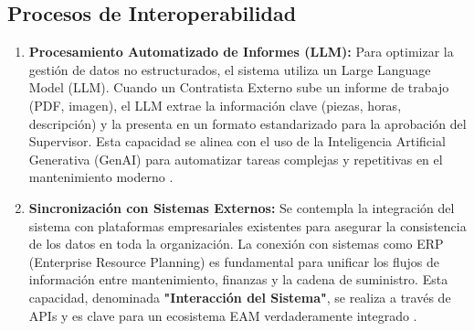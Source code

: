 \subsection{Procesos de Interoperabilidad}

\begin{enumerate}
    \item \textbf{Procesamiento Automatizado de Informes (LLM):} Para optimizar la gestión de datos no estructurados, el sistema utiliza un Large Language Model (LLM). Cuando un Contratista Externo sube un informe de trabajo (PDF, imagen), el LLM extrae la información clave (piezas, horas, descripción) y la presenta en un formato estandarizado para la aprobación del Supervisor. Esta capacidad se alinea con el uso de la Inteligencia Artificial Generativa (GenAI) para automatizar tareas complejas y repetitivas en el mantenimiento moderno \parencite{chen:2025, hxgn:sf}.
    \item \textbf{Sincronización con Sistemas Externos:} Se contempla la integración del sistema con plataformas empresariales existentes para asegurar la consistencia de los datos en toda la organización. La conexión con sistemas como ERP (Enterprise Resource Planning) es fundamental para unificar los flujos de información entre mantenimiento, finanzas y la cadena de suministro. Esta capacidad, denominada \textbf{"Interacción del Sistema"}, se realiza a través de APIs y es clave para un ecosistema EAM verdaderamente integrado \parencite{anylogic:sf, ibm:2024, laurila:2017, tractian:2025a, zhang:2025}.
\end{enumerate}
